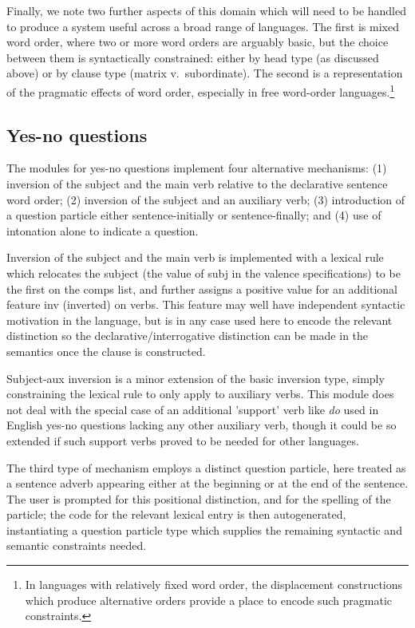 \documentclass[11pt]{article}
\begin{document}
Finally, we note two further aspects of this domain which will need
to be handled to produce a system useful across a broad range of
languages.  The first is mixed word order, where two or more word
orders are arguably basic, but the choice between them is syntactically
constrained: either by head type (as discussed above) or by clause
type (matrix v.\ subordinate).  The second is a representation of the
pragmatic effects of word order, especially in free word-order
languages.\footnote{In languages with relatively fixed word order, the
displacement constructions which produce alternative orders provide a
place to encode such pragmatic constraints.}


\subsection{Yes-no questions}

The modules for yes-no questions implement four alternative mechanisms:
(1) inversion of the subject and the main verb relative to the declarative
sentence word order; (2) inversion of the subject and an auxiliary
verb; (3) introduction of a question particle either sentence-initially or
sentence-finally; and (4) use of intonation alone to indicate a question.

Inversion of the subject and the main verb is implemented with a lexical
rule which relocates the subject (the value of {\sc subj} in the valence
specifications) to be the first on the {\sc comps} list, and further
assigns a positive value for an additional feature {\sc inv} (inverted)
on verbs.  This feature may well have independent syntactic motivation in 
the language, but is in any case used here to encode the relevant distinction
so the declarative/interrogative distinction can be made in the semantics
once the clause is constructed.

Subject-aux inversion is a minor extension of the basic inversion type,
simply constraining the lexical rule to only apply to auxiliary verbs.
This module does not deal with the special case of an additional 'support'
verb like {\it do} used in English yes-no questions lacking any other
auxiliary verb, though it could be so extended if such support verbs
proved to be needed for other languages.

The third type of mechanism employs a distinct question particle, here
treated as a sentence adverb appearing either at the beginning or at the
end of the sentence.  The user is prompted for this positional distinction,
and for the spelling of the particle; the code for the relevant lexical
entry is then autogenerated, instantiating a question particle type which
supplies the remaining syntactic and semantic constraints needed.
\end{document}
